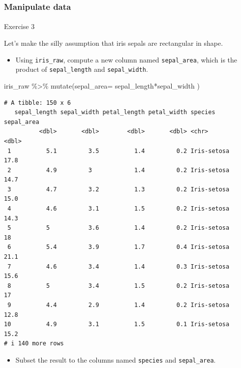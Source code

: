 \documentclass[
  letterpaper,
  DIV=11,
  numbers=noendperiod]{scrartcl}
\makeatletter
\let\oldparagraph\paragraph
\renewcommand{\paragraph}{
    \@ifstar
      \xxxParagraphStar
      \xxxParagraphNoStar
  }
\newcommand{\xxxParagraphStar}[1]{\oldparagraph*{#1}\mbox{}}
\newcommand{\xxxParagraphNoStar}[1]{\oldparagraph{#1}\mbox{}}
\newenvironment{Shaded}{\begin{snugshade}}{\end{snugshade}}
\newcommand{\AttributeTok}[1]{\textcolor[rgb]{0.40,0.45,0.13}{#1}}
\newcommand{\FunctionTok}[1]{\textcolor[rgb]{0.28,0.35,0.67}{#1}}
\newcommand{\NormalTok}[1]{\textcolor[rgb]{0.00,0.23,0.31}{#1}}
\newcommand{\SpecialCharTok}[1]{\textcolor[rgb]{0.37,0.37,0.37}{#1}}
\providecommand{\tightlist}{%
  \setlength{\itemsep}{0pt}\setlength{\parskip}{0pt}}\usepackage{longtable,booktabs,array}
\makeatother
\begin{document}
\subsubsection{Manipulate data}\label{manipulate-data-1}

\paragraph{Exercise 3}\label{exercise-3-1}

Let's make the silly assumption that iris sepals are rectangular in
shape.

\begin{itemize}
\tightlist
\item
  Using \texttt{iris\_raw}, compute a new column named
  \texttt{sepal\_area}, which is the product of \texttt{sepal\_length}
  and \texttt{sepal\_width}.
\end{itemize}

\begin{Shaded}
\begin{Highlighting}[]
\NormalTok{iris\_raw }\SpecialCharTok{\%\textgreater{}\%} \FunctionTok{mutate}\NormalTok{(}\AttributeTok{sepal\_area=}\NormalTok{ sepal\_length}\SpecialCharTok{*}\NormalTok{sepal\_width )}
\end{Highlighting}
\end{Shaded}

\begin{verbatim}
# A tibble: 150 x 6
   sepal_length sepal_width petal_length petal_width species     sepal_area
          <dbl>       <dbl>        <dbl>       <dbl> <chr>            <dbl>
 1          5.1         3.5          1.4         0.2 Iris-setosa       17.8
 2          4.9         3            1.4         0.2 Iris-setosa       14.7
 3          4.7         3.2          1.3         0.2 Iris-setosa       15.0
 4          4.6         3.1          1.5         0.2 Iris-setosa       14.3
 5          5           3.6          1.4         0.2 Iris-setosa       18  
 6          5.4         3.9          1.7         0.4 Iris-setosa       21.1
 7          4.6         3.4          1.4         0.3 Iris-setosa       15.6
 8          5           3.4          1.5         0.2 Iris-setosa       17  
 9          4.4         2.9          1.4         0.2 Iris-setosa       12.8
10          4.9         3.1          1.5         0.1 Iris-setosa       15.2
# i 140 more rows
\end{verbatim}

\begin{itemize}
\tightlist
\item
  Subset the result to the columns named \texttt{species} and
  \texttt{sepal\_area}.
\end{itemize}
\end{document}
